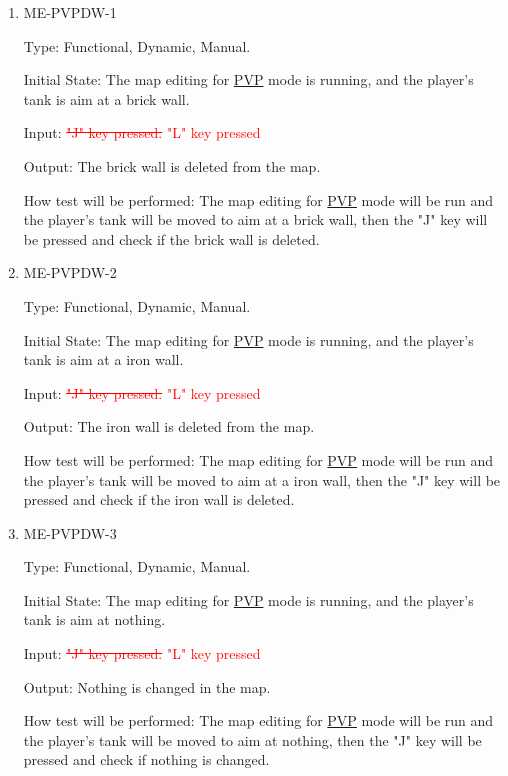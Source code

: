 \documentclass[12pt, titlepage]{article}
\begin{document}
\begin{enumerate}

\item{ME-PVPDW-1\\}

Type: Functional, Dynamic, Manual.
					
Initial State: The map editing for \underline{PVP} mode is running, and the player's tank is aim at a brick wall.
					
Input: \textcolor{red}{\sout{"J" key pressed.}} \textcolor{red}{"L" key pressed}
					
Output: The brick wall is deleted from the map.
					
How test will be performed: The map editing for \underline{PVP} mode will be run and the player's tank will be moved to aim at a brick wall, then the "J" key will be pressed and check if the brick wall is deleted.

\item{ME-PVPDW-2\\}

Type: Functional, Dynamic, Manual.
					
Initial State: The map editing for \underline{PVP} mode is running, and the player's tank is aim at a iron wall.
					
Input: \textcolor{red}{\sout{"J" key pressed.}} \textcolor{red}{"L" key pressed}
					
Output: The iron wall is deleted from the map.
					
How test will be performed: The map editing for \underline{PVP} mode will be run and the player's tank will be moved to aim at a iron wall, then the "J" key will be pressed and check if the iron wall is deleted.

\item{ME-PVPDW-3\\}

Type: Functional, Dynamic, Manual.
					
Initial State: The map editing for \underline{PVP} mode is running, and the player's tank is aim at nothing.
					
Input: \textcolor{red}{\sout{"J" key pressed.}} \textcolor{red}{"L" key pressed}
					
Output: Nothing is changed in the map.
					
How test will be performed: The map editing for \underline{PVP} mode will be run and the player's tank will be moved to aim at nothing, then the "J" key will be pressed and check if nothing is changed.

\end{enumerate}
\end{document}

